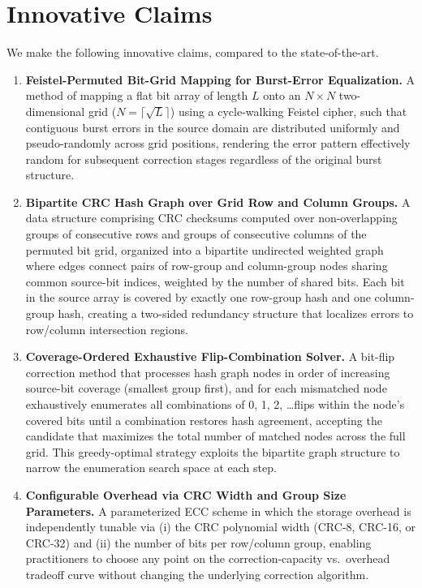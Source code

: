 \section*{Innovative Claims}
\noindent We make the following innovative claims, compared to the state-of-the-art.
\begin{enumerate}

    \item \textbf{Feistel-Permuted Bit-Grid Mapping for Burst-Error Equalization.}
    A method of mapping a flat bit array of length $L$ onto an $N \times N$ two-dimensional grid ($N = \lceil\sqrt{L}\rceil$) using a cycle-walking Feistel cipher, such that contiguous burst errors in the source domain are distributed uniformly and pseudo-randomly across grid positions, rendering the error pattern effectively random for subsequent correction stages regardless of the original burst structure.

    \item \textbf{Bipartite CRC Hash Graph over Grid Row and Column Groups.}
    A data structure comprising CRC checksums computed over non-overlapping groups of consecutive rows and groups of consecutive columns of the permuted bit grid, organized into a bipartite undirected weighted graph where edges connect pairs of row-group and column-group nodes sharing common source-bit indices, weighted by the number of shared bits.
    Each bit in the source array is covered by exactly one row-group hash and one column-group hash, creating a two-sided redundancy structure that localizes errors to row/column intersection regions.

    \item \textbf{Coverage-Ordered Exhaustive Flip-Combination Solver.}
    A bit-flip correction method that processes hash graph nodes in order of increasing source-bit coverage (smallest group first), and for each mismatched node exhaustively enumerates all combinations of 0, 1, 2, \ldots flips within the node's covered bits until a combination restores hash agreement, accepting the candidate that maximizes the total number of matched nodes across the full grid.
    This greedy-optimal strategy exploits the bipartite graph structure to narrow the enumeration search space at each step.

    \item \textbf{Configurable Overhead via CRC Width and Group Size Parameters.}
    A parameterized ECC scheme in which the storage overhead is independently tunable via (i) the CRC polynomial width (CRC-8, CRC-16, or CRC-32) and (ii) the number of bits per row/column group, enabling practitioners to choose any point on the correction-capacity vs.\ overhead tradeoff curve without changing the underlying correction algorithm.


\end{enumerate}
